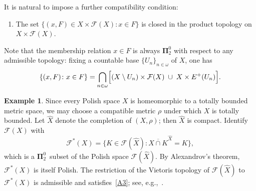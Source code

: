 \documentclass[12pt]{amsart}
\theoremstyle{plain}
\theoremstyle{definition}
\newtheorem{example}[theorem]{Example}
\theoremstyle{remark}
\begin{document}
It is natural to impose a further compatibility condition:
\begin{enumerate}[resume*]
    \item\label{A3} The set
      $\{(x, F) \in X \times \mathcal{F}(X) \colon x \in F\}$ is closed in the
      product topology on $X \times \mathcal{F}(X)$.
\end{enumerate}
Note that the membership relation $x \in F$ is always
$\boldsymbol{\Pi}^0_2$ with respect to any admissible topology: fixing a
countable base $\{U_n\}_{n \in \omega}$ of $X$, one has
\[
    \{(x,F) \colon x \in F\}
    = \bigcap_{n \in \omega}
      \Bigl[(X \setminus U_n) \times \mathcal{F}(X) \;\cup\; X \times E^+(U_n)\Bigr].
\]

\begin{example}\label{ex:compact}
Since every Polish space $X$ is homeomorphic to a totally bounded metric space,
we may choose a compatible metric $\rho$ under which $X$ is totally bounded.  Let
$\hat{X}$ denote the completion of $(X, \rho)$; then $\hat{X}$ is compact.
Identify $\mathcal{F}(X)$ with
\[
    \mathcal{F}^*(X) = \bigl\{K \in \mathcal{F}(\hat{X}) \colon
    \overline{X \cap K}^{\hat{X}} = K\bigr\},
\]
which is a $\boldsymbol{\Pi}^0_2$~subset of the Polish space
$\mathcal{F}(\hat{X})$.  By Alexandrov's theorem, $\mathcal{F}^*(X)$ is itself
Polish.  The restriction of the Vietoris topology of $\mathcal{F}(\hat{X})$ to
$\mathcal{F}^*(X)$ is admissible and satisfies~\ref{A3};
see, e.g.,~\cite[Chapter~2]{Dod2010Ban}.
\end{example}
\end{document}
